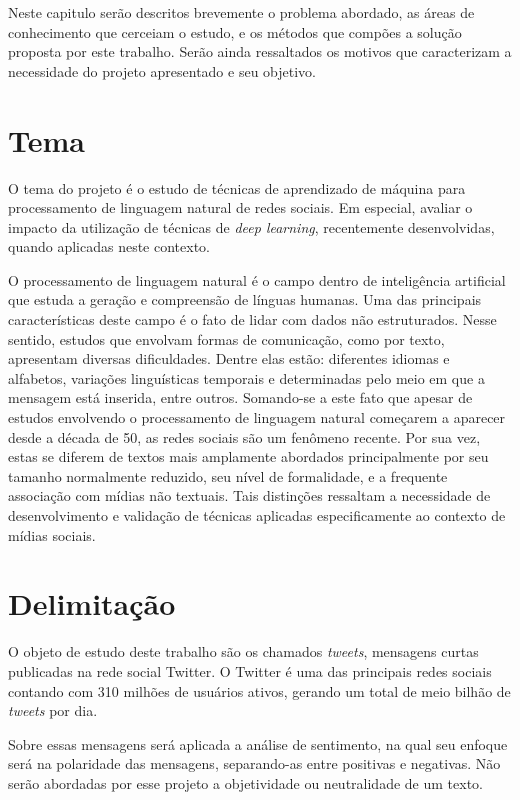 Neste capitulo serão descritos brevemente o problema abordado, as áreas de conhecimento que cerceiam o estudo, e os
métodos que compões a solução proposta por este trabalho.
Serão ainda ressaltados os motivos que caracterizam a necessidade do projeto apresentado e seu objetivo.

\section{Tema}

O tema do projeto é o estudo de técnicas de aprendizado de máquina para processamento de linguagem natural de redes
sociais.
Em especial, avaliar o impacto da utilização de técnicas de \textit{deep learning}, recentemente desenvolvidas, quando
aplicadas neste contexto.

O processamento de linguagem natural é o campo dentro de inteligência artificial que estuda a geração e compreensão de
línguas humanas.
Uma das principais características deste campo é o fato de lidar com dados não estruturados.
Nesse sentido, estudos que envolvam formas de comunicação, como por texto, apresentam diversas dificuldades.
Dentre elas estão: diferentes idiomas e alfabetos, variações linguísticas temporais e determinadas pelo meio em que a
mensagem está inserida, entre outros.
Somando-se a este fato que apesar de estudos envolvendo o processamento de linguagem natural começarem a aparecer desde
a década de 50, as redes sociais são um fenômeno recente.
Por sua vez, estas se diferem de textos mais amplamente abordados principalmente por seu tamanho normalmente reduzido,
seu nível de formalidade, e a frequente associação com mídias não textuais.
Tais distinções ressaltam a necessidade de desenvolvimento e validação de técnicas aplicadas especificamente ao contexto
de mídias sociais.

\section{Delimitação}

O objeto de estudo deste trabalho são os chamados \textit{tweets}, mensagens curtas publicadas na rede social Twitter.
O Twitter é uma das principais redes sociais contando com 310 milhões de usuários ativos, gerando um total de meio
bilhão de \textit{tweets} por dia.

Sobre essas mensagens será aplicada a análise de sentimento, na qual seu enfoque será na polaridade das mensagens,
separando-as entre positivas e negativas.
Não serão abordadas por esse projeto a objetividade ou neutralidade de um texto.

